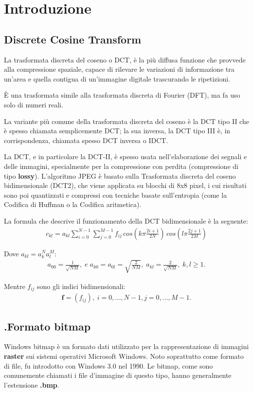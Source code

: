 \documentclass[preprint,12pt]{elsarticle}
\begin{document}
	\newpage
	
	\section{Introduzione}
	\subsection{Discrete Cosine Transform}
	La trasformata discreta del coseno o DCT, è la più diffusa funzione che provvede alla compressione spaziale, capace di rilevare le variazioni di informazione tra un'area e quella contigua di un'immagine digitale trascurando le ripetizioni.
	
	È una trasformata simile alla trasformata discreta di Fourier (DFT), ma fa uso solo di numeri reali.
	
	La variante più comune della trasformata discreta del coseno è la DCT tipo II che è spesso chiamata semplicemente DCT; la sua inversa, la DCT tipo III è, in corrispondenza, chiamata spesso DCT inversa o IDCT. 
	
	La DCT, e in particolare la DCT-II, è spesso usata nell'elaborazione dei segnali e delle immagini, specialmente per la compressione con perdita (compressione di tipo \textbf{lossy}). L'algoritmo JPEG è basato sulla Trasformata discreta del coseno bidimensionale (DCT2), che viene applicata su blocchi di 8x8 pixel, i cui risultati sono poi quantizzati e compressi con tecniche basate sull'entropia (come la Codifica di Huffman o la Codifica aritmetica).
	
	\bigskip
	La formula che descrive il funzionamento della DCT bidimensionale è la seguente:
	\begin{eqnarray*}
		c_{kl} = a_{kl} \sum_{i=0}^{N-1} \sum_{j=0}^{M-1} f_{ij} \,  cos\left(k\pi \frac{2i+1}{2N}\right) \, cos\left(l\pi \frac{2j+1}{2M}\right)
	\end{eqnarray*}
	
	Dove $a_{kl} = a_{k}^{N} a_{l}^{M}$:
	\begin{eqnarray*}
		a_{00} = \frac{1}{\sqrt{NM}},\; e \; a_{k0} = a_{0l} = \sqrt{\frac{2}{NM}},\; a_{kl} = \frac{2}{\sqrt{NM}}, \; k, l \geq 1.
	\end{eqnarray*}
	
	Mentre $f_{ij}$ sono gli indici bidimensionali:
	\begin{eqnarray*}
		\textbf{f} = (f_{ij}), \; i=0, ..., N-1, j=0, ..., M-1.
	\end{eqnarray*}
	
	\subsection{.Formato bitmap}
	Windows bitmap è un formato dati utilizzato per la rappresentazione di immagini \textbf{raster} sui sistemi operativi Microsoft Windows. Noto soprattutto come formato di file, fu introdotto con Windows 3.0 nel 1990.
	Le bitmap, come sono comunemente chiamati i file d'immagine di questo tipo, hanno generalmente l'estensione \textbf{.bmp}.
	
\end{document}
